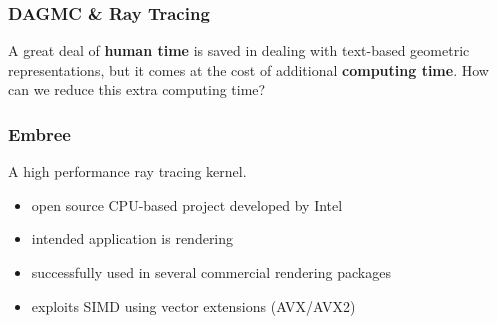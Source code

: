\documentclass[12pt]{beamer}
\begin{document}
\begin{frame}

  \frametitle{DAGMC \& Ray Tracing}
  
  A great deal of \textbf{human time} is saved in dealing with text-based geometric representations, but it comes at the cost of additional \textbf{computing time}.
 \vfill
 How can we reduce this extra computing time?

 \vfill

  
\end{frame}

\begin{frame}
  \frametitle{Embree}
  \begin{center}
  \end{center}
  A high performance ray tracing kernel. \cite{embree}
  \vfill
  \begin{itemize}
  \item open source CPU-based project developed by Intel
  \item intended application is rendering
  \item successfully used in several commercial rendering packages
  \item exploits SIMD using vector extensions (AVX/AVX2) 
  \end{itemize}

  
\end{frame}
\end{document}
